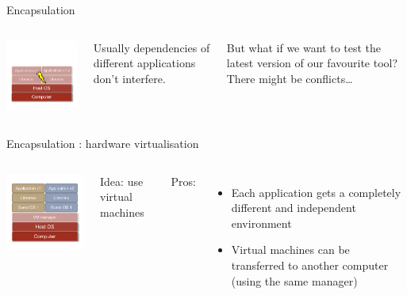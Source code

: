 \begin{frame}{Encapsulation}
\begin{columns}

\includegraphics[width=6cm]{02_encapsulation/figures/intro_2_app_versions_53.pdf}

Usually dependencies of different applications don’t interfere.


But what if we want to test the latest version of our favourite tool?
There might be conflicts…

\end{columns}
\end{frame}

\begin{frame}{Encapsulation : hardware virtualisation}
\begin{columns}

\includegraphics[width=6cm]{02_encapsulation/figures/intro_hardware_virtualisation_54.pdf}

Idea: use virtual machines

Pros: 
\begin{itemize}
  \item Each application gets a completely different and independent environment
  \item Virtual machines can be transferred to another computer (using the same manager)
\end{itemize}

\end{columns}
\end{frame}

